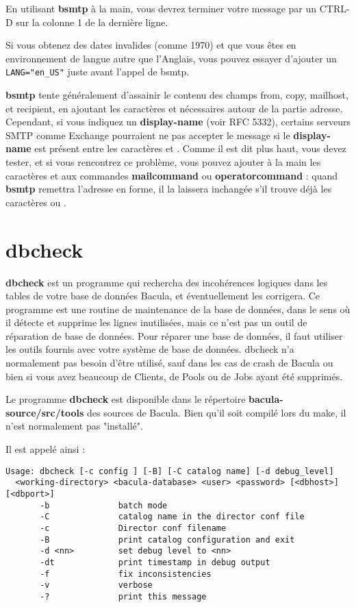 En utilisant {\bf bsmtp} à la main, vous devrez terminer votre message par un 
CTRL-D sur la colonne 1 de la dernière ligne.

Si vous obtenez des dates invalides (comme 1970) et que vous êtes en 
environnement de langue autre que l'Anglais, vous pouvez essayer d'ajouter un
{\tt LANG="en\_US"} juste avant l'appel de bsmtp.

{\bf bsmtp} tente généralement d'assainir le contenu des champs from, copy, 
mailhost, et recipient, en ajoutant les caractères \lt{} et \gt{} nécessaires
autour de la partie adresse. Cependant, si vous indiquez un {\bf display-name}
(voir RFC 5332), certains serveurs SMTP comme Exchange pourraient ne pas 
accepter le message si le {\bf display-name} est présent entre les caractères 
\lt{} et \gt{}.  Comme il est dit plus haut, vous devez tester, et si vous
rencontrez ce problème, vous pouvez ajouter à la main les caractères \lt{} et
\gt{} aux commandes {\bf mailcommand} ou {\bf operatorcommand} : quand 
{\bf bsmtp} remettra l'adresse en forme, il la laissera inchangée s'il trouve
déjà les caractères \lt{} ou \gt{}.

\section{dbcheck}
\label{dbcheck}
{\bf dbcheck} est un programme qui rechercha des incohérences logiques dans les
tables de votre base de données Bacula, et éventuellement les corrigera.
Ce programme est une routine de maintenance de la base de données, dans le sens
où il détecte et supprime les lignes inutilisées, mais ce n'est pas un outil de 
réparation de base de données. Pour réparer une base de données, il faut 
utiliser les outils fournis avec votre système de base de données. dbcheck n'a
normalement pas besoin d'être utilisé, sauf dans les cas de crash de Bacula ou 
bien si vous avez beaucoup de Clients, de Pools ou de Jobs ayant été supprimés.
                             
Le programme {\bf dbcheck} est disponible dans le répertoire
{\bf \lt{}bacula-source\gt{}/src/tools} des sources de Bacula. Bien qu'il soit
compilé lors du make, il n'est normalement pas "installé".

Il est appelé ainsi :

\footnotesize
\begin{verbatim}
Usage: dbcheck [-c config ] [-B] [-C catalog name] [-d debug_level] 
  <working-directory> <bacula-database> <user> <password> [<dbhost>] [<dbport>]
       -b              batch mode
       -C              catalog name in the director conf file
       -c              Director conf filename
       -B              print catalog configuration and exit
       -d <nn>         set debug level to <nn>
       -dt             print timestamp in debug output
       -f              fix inconsistencies
       -v              verbose
       -?              print this message
\end{verbatim}
\normalsize

